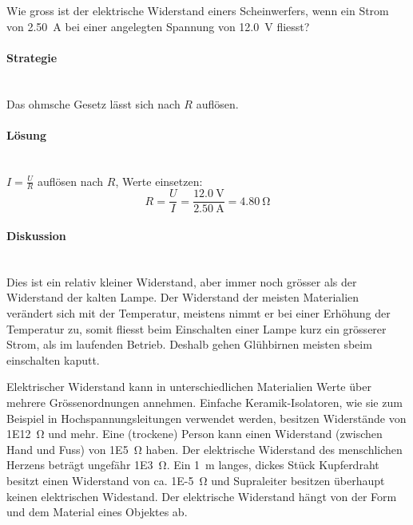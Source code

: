 \documentclass[11pt,twoside=false,open=any]{scrbook}
\begin{document}
\begin{tcolorbox}[breakable,colback=white, title=Beispiel: Berechnung des Widerstandes eines Autoscheinwerfers]
Wie gross ist der elektrische Widerstand einers Scheinwerfers, wenn ein Strom von \SI{2.50}{\ampere} bei einer angelegten Spannung von \SI{12.0}{\volt} fliesst?
\paragraph{Strategie}\mbox{}\\
    Das ohmsche Gesetz lässt sich nach $R$ auflösen.
\paragraph{Lösung}\mbox{}\\
    $I=\frac{U}{R}$ auflösen nach $R$, Werte einsetzen:
    \[ R = \frac{U}{I} = \frac{\SI{12.0}{\volt}}{\SI{2.50}{\ampere}}= \SI{4.80}{\ohm} \]
\paragraph{Diskussion}\mbox{}\\
   Dies ist ein relativ kleiner Widerstand, aber immer noch grösser als der Widerstand der kalten Lampe. Der Widerstand der meisten Materialien verändert sich mit der Temperatur, meistens nimmt er bei einer Erhöhung der Temperatur zu, somit fliesst beim Einschalten einer Lampe kurz ein grösserer Strom, als im laufenden Betrieb. Deshalb gehen Glühbirnen meisten sbeim einschalten kaputt.

\end{tcolorbox}

Elektrischer Widerstand kann in unterschiedlichen Materialien Werte über mehrere Grössenordnungen annehmen. Einfache Keramik-Isolatoren, wie sie zum Beispiel in Hochspannungsleitungen verwendet werden, besitzen Widerstände von \SI{1E12}{\ohm} und mehr. Eine (trockene) Person kann einen Widerstand (zwischen Hand und Fuss) von \SI{1E5}{\ohm} haben. Der elektrische Widerstand des menschlichen Herzens beträgt ungefähr \SI{1E3}{\ohm}. Ein \SI{1}{m} langes, dickes Stück Kupferdraht besitzt einen Widerstand von ca. \SI{1E-5}{\ohm} und Supraleiter besitzen überhaupt keinen elektrischen Widestand. Der elektrische Widerstand hängt von der Form und dem Material eines Objektes ab. 
\end{document}
